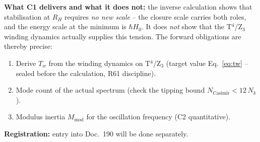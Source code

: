 \documentclass[11pt]{report}
\begin{document}
\medskip
\noindent\textbf{What C1 delivers and what it does not:} the inverse
calculation shows that stabilisation at $R_H$ requires \emph{no new
scale} -- the closure scale carries both roles, and the energy scale
at the minimum is $\hbar H_0$. It does \emph{not} show that the
T$^4$/Z$_3$ winding dynamics actually supplies this tension. The
forward obligations are thereby precise:

\begin{enumerate}
  \item Derive $T_w$ from the winding dynamics on T$^4$/Z$_3$
        (target value Eq.~\eqref{eq:tw} -- sealed before the
        calculation, R61 discipline).
  \item Mode count of the actual spectrum (check the tipping bound
        $N_\text{Casimir} < 12\,N_k$).
  \item Modulus inertia $M_\text{mod}$ for the oscillation frequency
        (C2 quantitative).
\end{enumerate}

\noindent\textbf{Registration:} entry into Doc.~190 will be done
separately.
\end{document}
